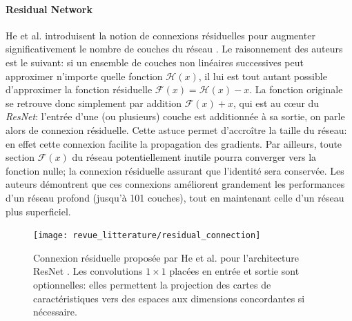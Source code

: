 \paragraph{Residual Network}
\label{sec:resnet}
He et al. introduisent la notion de connexions résiduelles pour augmenter significativement le nombre de couches du réseau \cite{heDeepResidualLearning2016b}. Le raisonnement des auteurs est le suivant: si un ensemble de couches non linéaires successives peut approximer n'importe quelle fonction $\mathcal{H}(x)$, il lui est tout autant possible d'approximer la fonction résiduelle $\mathcal{F}(x) = \mathcal{H}(x) - x$. La fonction originale se retrouve donc simplement par addition $\mathcal{F}(x) + x$, qui est au c\oe ur du \textit{ResNet}: l'entrée d'une (ou plusieurs) couche est additionnée à sa sortie, on parle alors de connexion résiduelle. Cette \og astuce \fg permet d'accroître la taille du réseau: en effet cette connexion facilite la propagation des gradients. Par ailleurs, toute section $\mathcal{F}(x)$ du réseau potentiellement inutile pourra converger vers la fonction nulle; la connexion résiduelle assurant que l'identité sera conservée. Les auteurs démontrent que ces connexions améliorent grandement les performances d'un réseau profond (jusqu'à 101 couches), tout en maintenant celle d'un réseau plus superficiel.

\begin{figure}[htb]
	\centering
	\texttt{[image: revue\_litterature/residual\_connection]}
	\caption{Connexion résiduelle proposée par He et al. pour l'architecture ResNet \cite{heDeepResidualLearning2016b}. Les convolutions $1\times 1$ placées en entrée et sortie sont optionnelles: elles permettent la projection des cartes de caractéristiques vers des espaces aux dimensions concordantes si nécessaire.}
	\label{fig:ResNet}
\end{figure}

